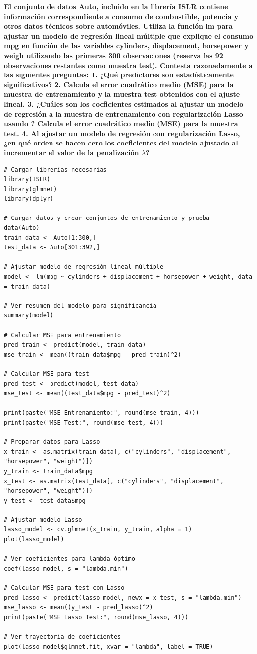 \textbf{El conjunto de datos Auto, incluido en la librería ISLR contiene información correspondiente a consumo de combustible, potencia y otros
datos técnicos sobre automóviles. Utiliza la función lm para ajustar un modelo de regresión lineal múltiple que explique el consumo mpg en
función de las variables cylinders, displacement, horsepower y weigh utilizando las primeras 300 observaciones (reserva las 92 observaciones
restantes como muestra test). Contesta razonadamente a las siguientes preguntas:
1. ¿Qué predictores son estadísticamente significativos?
2. Calcula el error cuadrático medio (MSE) para la muestra de entrenamiento y la muestra test obtenidos con el ajuste lineal.
3. ¿Cuáles son los coeficientes estimados al ajustar un modelo de regresión a la muestra de entrenamiento con regularización Lasso
usando ? Calcula el error cuadrático medio (MSE) para la muestra test.
4. Al ajustar un modelo de regresión con regularización Lasso, ¿en qué orden se hacen cero los coeficientes del modelo ajustado al
incrementar el valor de la penalización $\lambda$?}

\begin{verbatim}
# Cargar librerías necesarias
library(ISLR)
library(glmnet)
library(dplyr)

# Cargar datos y crear conjuntos de entrenamiento y prueba
data(Auto)
train_data <- Auto[1:300,]
test_data <- Auto[301:392,]

# Ajustar modelo de regresión lineal múltiple
model <- lm(mpg ~ cylinders + displacement + horsepower + weight, data = train_data)

# Ver resumen del modelo para significancia
summary(model)

# Calcular MSE para entrenamiento
pred_train <- predict(model, train_data)
mse_train <- mean((train_data$mpg - pred_train)^2)

# Calcular MSE para test
pred_test <- predict(model, test_data)
mse_test <- mean((test_data$mpg - pred_test)^2)

print(paste("MSE Entrenamiento:", round(mse_train, 4)))
print(paste("MSE Test:", round(mse_test, 4)))

# Preparar datos para Lasso
x_train <- as.matrix(train_data[, c("cylinders", "displacement", "horsepower", "weight")])
y_train <- train_data$mpg
x_test <- as.matrix(test_data[, c("cylinders", "displacement", "horsepower", "weight")])
y_test <- test_data$mpg

# Ajustar modelo Lasso
lasso_model <- cv.glmnet(x_train, y_train, alpha = 1)
plot(lasso_model)

# Ver coeficientes para lambda óptimo
coef(lasso_model, s = "lambda.min")

# Calcular MSE para test con Lasso
pred_lasso <- predict(lasso_model, newx = x_test, s = "lambda.min")
mse_lasso <- mean((y_test - pred_lasso)^2)
print(paste("MSE Lasso Test:", round(mse_lasso, 4)))

# Ver trayectoria de coeficientes
plot(lasso_model$glmnet.fit, xvar = "lambda", label = TRUE)
\end{verbatim}

